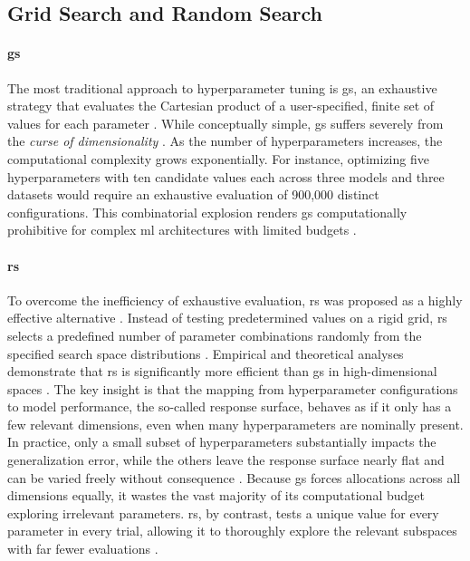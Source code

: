 \subsection{Grid Search and Random Search}
\label{sec:theoretical_grid_random}

\paragraph{\gls{gs}}
The most traditional approach to hyperparameter tuning is \gls{gs}, an exhaustive strategy that evaluates the Cartesian product of a user-specified, finite set of values for each parameter \parencite{yangHyperparameterOptimizationMachine2020}. While conceptually simple, \gls{gs} suffers severely from the \textit{curse of dimensionality} \parencite{bergstraRandomSearchHyperParameter2012, yangHyperparameterOptimizationMachine2020}. As the number of hyperparameters increases, the computational complexity grows exponentially. For instance, optimizing five hyperparameters with ten candidate values each across three models and three datasets would require an exhaustive evaluation of 900,000 distinct configurations. This combinatorial explosion renders \gls{gs} computationally prohibitive for complex \gls{ml} architectures with limited budgets \parencite{yangHyperparameterOptimizationMachine2020}.

\paragraph{\gls{rs}}
To overcome the inefficiency of exhaustive evaluation, \gls{rs} was proposed as a highly effective alternative \parencite{bergstraRandomSearchHyperParameter2012}. Instead of testing predetermined values on a rigid grid, \gls{rs} selects a predefined number of parameter combinations randomly from the specified search space distributions \parencite{yangHyperparameterOptimizationMachine2020}. Empirical and theoretical analyses demonstrate that \gls{rs} is significantly more efficient than \gls{gs} in high-dimensional spaces \parencite{bergstraRandomSearchHyperParameter2012}. The key insight is that the mapping from hyperparameter configurations to model performance, the so-called response surface, behaves as if it only has a few relevant dimensions, even when many hyperparameters are nominally present. In practice, only a small subset of hyperparameters substantially impacts the generalization error, while the others leave the response surface nearly flat and can be varied freely without consequence \parencite{bergstraRandomSearchHyperParameter2012}. Because \gls{gs} forces allocations across all dimensions equally, it wastes the vast majority of its computational budget exploring irrelevant parameters. \gls{rs}, by contrast, tests a unique value for every parameter in every trial, allowing it to thoroughly explore the relevant subspaces with far fewer evaluations \parencite{bergstraRandomSearchHyperParameter2012}.

